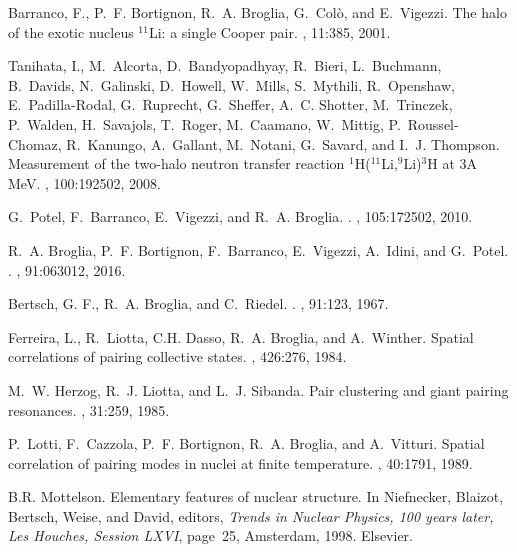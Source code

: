 \documentclass[a4paper,11pt]{article}
\numberwithin{equation}{section}
\numberwithin{figure}{section}
\numberwithin{table}{section}
\begin{document}
\begin{thebibliography}{10}
	{Barranco, F.}, P.~F. Bortignon, R.~A. Broglia, G.~Col{\`{o}}, and E.~Vigezzi.
	\newblock The halo of the exotic nucleus $^{11}${Li}: a single {C}ooper pair.
	, 11:385, 2001.
	
	{Tanihata, I.}, M.~Alcorta, D.~Bandyopadhyay, R.~Bieri, L.~Buchmann, B.~Davids,
	N.~Galinski, D.~Howell, W.~Mills, S.~Mythili, R.~Openshaw, E.~Padilla-Rodal,
	G.~Ruprecht, G.~Sheffer, A.~C. Shotter, M.~Trinczek, P.~Walden, H.~Savajols,
	T.~Roger, M.~Caamano, W.~Mittig, P.~Roussel-Chomaz, R.~Kanungo, A.~Gallant,
	M.~Notani, G.~Savard, and I.~J. Thompson.
	\newblock Measurement of the two-halo neutron transfer reaction
	{$^1$H($^{11}$Li,$^{9}$Li)$^3$H} at {3A} {MeV}.
	, 100:192502, 2008.
	
	G.~Potel, F.~Barranco, E.~Vigezzi, and R.~A. Broglia.
	.
	, 105:172502, 2010.
	
	R.~A. Broglia, P.~F. Bortignon, F.~Barranco, E.~Vigezzi, A.~Idini, and
	G.~Potel.
	.
	, 91:063012, 2016.
	
	{Bertsch, G. F.}, R.~A. Broglia, and C.~Riedel.
	.
	, 91:123, 1967.
	
	{Ferreira, L.}, R.~Liotta, C.H. Dasso, R.~A. Broglia, and A.~Winther.
	\newblock Spatial correlations of pairing collective states.
	, 426:276, 1984.
	
	M.~W. Herzog, R.~J. Liotta, and L.~J. Sibanda.
	\newblock Pair clustering and giant pairing resonances.
	, 31:259, 1985.
	
	P.~Lotti, F.~Cazzola, P.~F. Bortignon, R.~A. Broglia, and A.~Vitturi.
	\newblock Spatial correlation of pairing modes in nuclei at finite temperature.
	, 40:1791, 1989.
	
	B.R. Mottelson.
	\newblock Elementary features of nuclear structure.
	\newblock In Niefnecker, Blaizot, Bertsch, Weise, and David, editors, {\em
		{Trends in Nuclear Physics, 100 years later, Les Houches, Session LXVI}},
	page~25, Amsterdam, 1998. Elsevier.
	

\end{thebibliography}
\end{document}

